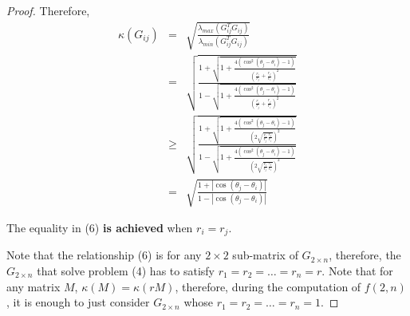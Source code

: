 \documentclass{sig-alternate}
\begin{document}
\begin{proof}
Therefore,
\begin{eqnarray}
\kappa (G_{ij}) \nonumber
&=& \sqrt {\frac {\lambda_{max} (G_{ij}^{T} G_{ij})}
 {\lambda_{min} (G_{ij}^{T} G_{ij})} } \\ \nonumber
&=& \sqrt { \frac {1 + \sqrt {1+\frac{4(\cos^2 (\theta_j -\theta_i)  -1)}
{ \left( \frac{r_{i}}{r_{j}}+\frac{r_{j}}{r_{i}}  \right)^2     }  } }
{1 - \sqrt {1+\frac{4(\cos^2 (\theta_j -\theta_i)  -1)}
{ \left( \frac{r_{i}}{r_{j}}+\frac{r_{j}}{r_{i}}  \right)^2   } } }
}  \\ 
&\geq&  \sqrt { \frac {1 + \sqrt {1+\frac{4(\cos^2 (\theta_j -\theta_i)  -1)}
{ \left( 2 \sqrt { \frac{r_{i}}{r_{j}} \frac{r_{j}}{r_{i}} } \right)^2     }  } }
{1 - \sqrt {1+\frac{4(\cos^2 (\theta_j -\theta_i)  -1)}
{ \left( 2 \sqrt { \frac{r_{i}}{r_{j}} \frac{r_{j}}{r_{i}} } \right)^2   } } }
}    \\ \nonumber
&=& \sqrt { \frac{1+ |\cos (\theta_j -\theta_i)  | }
{1- |\cos (\theta_j -\theta_i) | }  }
\end{eqnarray}

The equality in (6) {\bf is achieved} when $r_i=r_j$.

Note that the relationship (6) is for any $2 \times 2$ sub-matrix of 
$G_{2 \times n}$, therefore, the $G_{2 \times n}$ that solve
problem (4) has to satisfy $r_1=r_2=\ldots=r_n=r$. Note that
for any matrix $M$, $\kappa(M)=\kappa(r M)$, therefore, during the computation of $f(2,n)$, 
it is enough to just consider $G_{2 \times n}$ whose $r_1=r_2=\ldots=r_n=1$. 


\end{proof}
\end{document}
